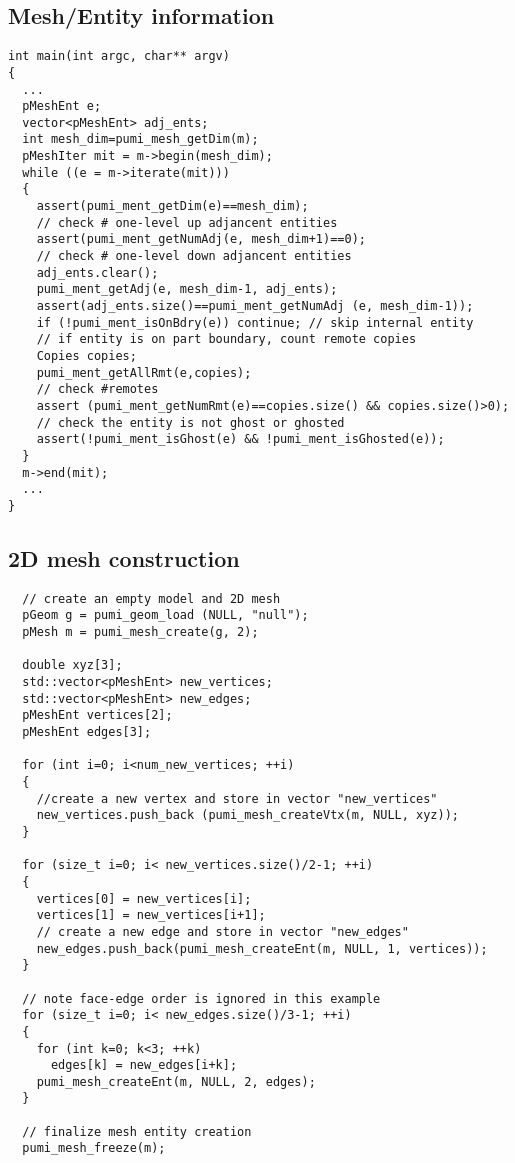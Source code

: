 \subsection{Mesh/Entity information}
\begin{small}
\begin{verbatim}
int main(int argc, char** argv)
{
  ...
  pMeshEnt e;
  vector<pMeshEnt> adj_ents;
  int mesh_dim=pumi_mesh_getDim(m);
  pMeshIter mit = m->begin(mesh_dim);
  while ((e = m->iterate(mit)))
  {
    assert(pumi_ment_getDim(e)==mesh_dim);
    // check # one-level up adjancent entities
    assert(pumi_ment_getNumAdj(e, mesh_dim+1)==0);
    // check # one-level down adjancent entities
    adj_ents.clear();
    pumi_ment_getAdj(e, mesh_dim-1, adj_ents);
    assert(adj_ents.size()==pumi_ment_getNumAdj (e, mesh_dim-1));
    if (!pumi_ment_isOnBdry(e)) continue; // skip internal entity
    // if entity is on part boundary, count remote copies    
    Copies copies;
    pumi_ment_getAllRmt(e,copies);
    // check #remotes
    assert (pumi_ment_getNumRmt(e)==copies.size() && copies.size()>0);
    // check the entity is not ghost or ghosted
    assert(!pumi_ment_isGhost(e) && !pumi_ment_isGhosted(e));
  }
  m->end(mit);
  ...
}
\end{verbatim}
\end{small}


\subsection{2D mesh construction}
\begin{small}
\begin{verbatim}
  // create an empty model and 2D mesh
  pGeom g = pumi_geom_load (NULL, "null");
  pMesh m = pumi_mesh_create(g, 2);

  double xyz[3];
  std::vector<pMeshEnt> new_vertices;
  std::vector<pMeshEnt> new_edges;
  pMeshEnt vertices[2];
  pMeshEnt edges[3];

  for (int i=0; i<num_new_vertices; ++i)
  {
    //create a new vertex and store in vector "new_vertices"
    new_vertices.push_back (pumi_mesh_createVtx(m, NULL, xyz));
  }

  for (size_t i=0; i< new_vertices.size()/2-1; ++i)
  {
    vertices[0] = new_vertices[i];    
    vertices[1] = new_vertices[i+1]; 
    // create a new edge and store in vector "new_edges"
    new_edges.push_back(pumi_mesh_createEnt(m, NULL, 1, vertices));
  }

  // note face-edge order is ignored in this example
  for (size_t i=0; i< new_edges.size()/3-1; ++i)
  {
    for (int k=0; k<3; ++k)
      edges[k] = new_edges[i+k];     
    pumi_mesh_createEnt(m, NULL, 2, edges);
  }

  // finalize mesh entity creation
  pumi_mesh_freeze(m);
\end{verbatim}
\end{small}

